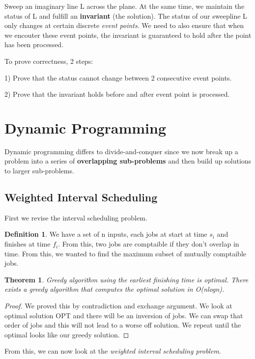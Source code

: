 \documentclass[11pt, oneside]{article}
\newtheorem{theorem}{Theorem}
\theoremstyle{definition}
\newtheorem{definition}{Definition}[section]
\begin{document}
Sweep an imaginary line L across the plane. At the same time, we maintain the status of L and fulfill an \textbf{invariant} (the solution). The status of our sweepline L only changes at certain discrete \textit{event points}. We need to also ensure that when we encouter these event points, the invariant is guaranteed to hold after the point has been processed.

To prove correctness, 2 steps:
\begin{center}
  1) Prove that the status cannot change between 2 consecutive event points.

  2) Prove that the invariant holds before and after event point is processed.
\end{center}


\newpage
\section{Dynamic Programming}
Dynamic programming differs to divide-and-conquer since we now break up a problem into a series of \textbf{overlapping sub-problems} and then build up solutions to larger sub-problems.

\subsection{Weighted Interval Scheduling}
First we revise the interval scheduling problem.
\begin{definition}
  We have a set of n inputs, each jobs at start at time $s_i$ and finishes at time $f_i$. From this, two jobs are comptaible if they don't overlap in time. From this, we wanted to find the maximum subset of mutually comptaible jobs.
\end{definition}

\begin{theorem}
  Greedy algorithm using the earliest finishing time is optimal. There exists a greedy algorithm that computes the optimal solution in O(nlogn).
\end{theorem}
\begin{proof}
  We proved this by contradiction and exchange argument. We look at optimal solution OPT and there will be an inversion of jobs. We can swap that order of jobs and this will not lead to a worse off solution. We repeat until the optimal looks like our greedy solution.
\end{proof}

From this, we can now look at the \textit{weighted interval scheduling problem}.
\end{document}
